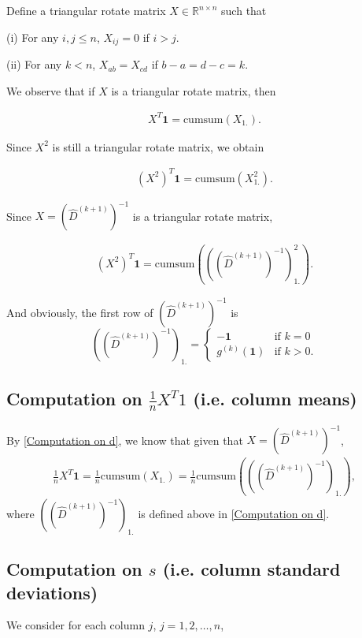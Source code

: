 Define a triangular rotate matrix $X \in \mathbb{R}^{n\times n}$ such that 

(i) For any $i, j \leq n$, $X_{ij} = 0$ if $i>j$.

(ii) For any $k < n$, $X_{ab} = X_{cd}$ if $b-a = d-c = k$. 


We observe that if $X$ is a triangular rotate matrix, then 

\begin{align}
X^T \bm{1} = \text{cumsum}(X_{1.}).
\end{align}

Since $X^2$ is still a triangular rotate matrix, we obtain

\begin{align}
(X^2)^T \bm{1} = \text{cumsum}(X^2_{1.}).
\end{align}

Since $X = (\hat{D}^{(k+1)})^{-1}$ is a triangular rotate matrix, 

\begin{align}
(X^2)^T \bm{1} = \text{cumsum}(((\hat{D}^{(k+1)})^{-1})_{1.}^2).
\end{align}

And obviously, the first row of $(\hat{D}^{(k+1)})^{-1}$ is 
\begin{equation}
 ((\hat{D}^{(k+1)})^{-1})_{1.} = 
    \begin{cases} 
      \bm{-1} & \text{if } k = 0 \\
      g^{(k)}(\bm{1}) & \text{if } k > 0.
   \end{cases}
\end{equation}

\subsection{Computation on $\frac{1}{n}X^T 1$ (i.e. column means)} \label{Computation on cm}

By \ref{Computation on d}, we know that given that $X = (\hat{D}^{(k+1)})^{-1}$,
\begin{align}
 \frac{1}{n} X^T \bm{1} = \frac{1}{n} \text{cumsum}(X_{1.}) = \frac{1}{n} \text{cumsum}(((\hat{D}^{(k+1)})^{-1})_{1.}),
\end{align}
where $((\hat{D}^{(k+1)})^{-1})_{1.}$ is defined above in \ref{Computation on d}. 

\subsection{Computation on $s$ (i.e. column standard deviations)}
We consider for each column $j$, $j=1,2,\dots, n$,

